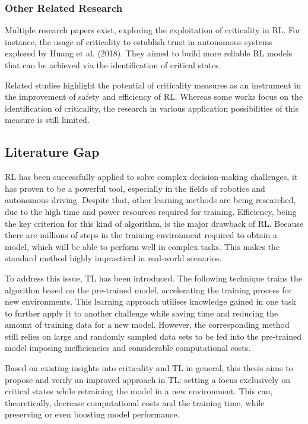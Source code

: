 \subsubsection{Other Related Research}\label{ssec:subsubsec_2.3.3}

Multiple research papers exist, exploring the exploitation of criticality in RL. For instance, the usage of criticality to establish trust in autonomous systems explored by Huang et al. (2018)\cite{huang2018establishingappropriatetrustcritical}. They aimed to build more reliable RL models that can be achieved via the identification of critical states.

Related studies highlight the potential of criticality measures as an instrument in the improvement of safety and efficiency of RL. Whereas some works focus on the identification of criticality, the research in various application possibilities of this measure is still limited.

\subsection{Literature Gap}\label{ssec:subsubsec_2.4}

RL has been successfully applied to solve complex decision-making challenges, it has proven to be a powerful tool, especially in the fields of robotics and autonomous driving. Despite that, other learning methods are being researched, due to the high time and power resources required for training. Efficiency, being the key criterion for this kind of algorithm, is the major drawback of RL. Because there are millions of steps in the training environment required to obtain a model, which will be able to perform well in complex tasks. This makes the standard method highly impractical in real-world scenarios. 

To address this issue, TL has been introduced. The following technique trains the algorithm based on the pre-trained model, accelerating the training process for new environments. This learning approach utilises knowledge gained in one task to further apply it to another challenge while saving time and reducing the amount of training data for a new model. However, the corresponding method still relies on large and randomly sampled data sets to be fed into the pre-trained model imposing inefficiencies and considerable computational costs. 

Based on existing insights into criticality and TL in general, this thesis aims to propose and verify an improved approach in TL: setting a focus exclusively on critical states while retraining the model in a new environment. This can, theoretically, decrease computational costs and the training time, while preserving or even boosting model performance. 


